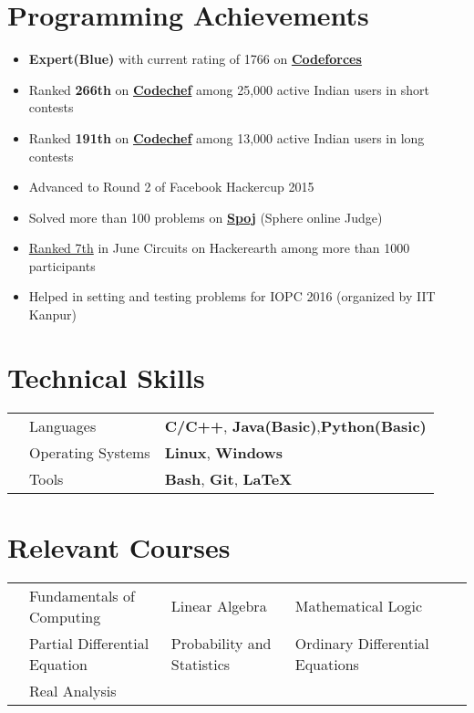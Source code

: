 \documentclass[11pt,a4paper]{article}
\begin{document}
\section*{Programming Achievements}
\begin{itemize}
\item \textbf{Expert(Blue)} with current rating of 1766 on  \href{http://codeforces.com/profile/Swastik1996} {\textbf{Codeforces}}
\item Ranked \textbf{266th} on \href{http://codechef.com/users/Swastik1996} {\textbf{Codechef}} among 25,000 active Indian users in short contests
\item Ranked \textbf{191th} on \href{http://codechef.com/users/Swastik1996} {\textbf{Codechef}} among 13,000 active Indian users in long contests
\item Advanced to Round 2 of Facebook Hackercup 2015
\item Solved more than 100 problems on \href{http://www.spoj.com/users/swastik1996/} {\textbf{Spoj}} (Sphere online Judge)
\item \href{https://www.hackerearth.com/june-circuits/leaderboard/} {Ranked 7th} in June Circuits on Hackerearth among more than 1000 participants 
\item Helped in setting and testing problems for IOPC 2016 (organized by IIT Kanpur)
\end{itemize}

\section*{Technical Skills}
\vspace{-0.2cm}
\begin{tabular}{L{0.05cm} L{5cm} l}
&Languages     &\textbf{C/C++}, \textbf{Java(Basic)},\textbf{Python(Basic)}\\
&Operating Systems     &\textbf{Linux}, \textbf{Windows}\\
&Tools &\textbf{Bash}, \textbf{Git}, \textbf{\LaTeX}\\
\end{tabular}
\vspace{-0.4cm}

\section*{Relevant Courses}
\vspace{-0.3cm}
\begin{tabular}{L{0.05cm} L{5.8cm} L{6.5cm} L{7.5cm} L{8cm} L{13cm}}
& Fundamentals of Computing  & Linear Algebra & Mathematical Logic \vspace{0.1cm}\\

& Partial Differential Equation & Probability and Statistics & Ordinary Differential Equations \vspace{0.1cm}\\
& Real Analysis

\end{tabular}
\vspace{-0.5cm}
\end{document}
